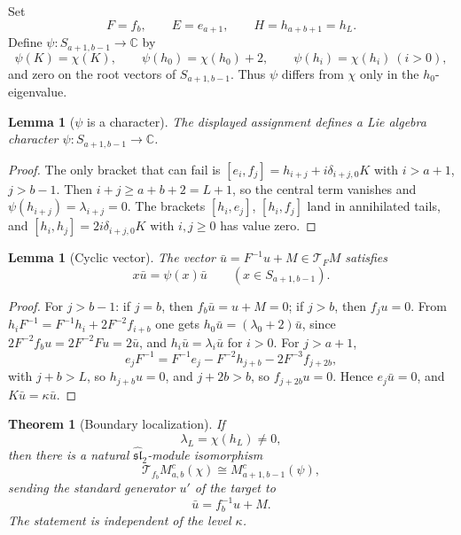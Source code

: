 \documentclass[11pt,a4paper]{article}
\newcommand{\C}{\mathbb C}
\newcommand{\slh}{\widehat{\mathfrak{sl}}_2}
\newcommand{\T}{\mathcal T}
\theoremstyle{plainupright}
\newtheorem{lemma}[proposition]{Lemma}
\newtheorem{theorem}[proposition]{Theorem}
\begin{document}
Set
\[
F=f_b,\qquad E=e_{a+1},\qquad H=h_{a+b+1}=h_L.
\]
Define \(\psi:S_{a+1,b-1}\to\C\) by
\[
\psi(K)=\chi(K),\qquad
\psi(h_0)=\chi(h_0)+2,\qquad
\psi(h_i)=\chi(h_i)\ (i>0),
\]
and zero on the root vectors of \(S_{a+1,b-1}\). Thus \(\psi\) differs from
\(\chi\) only in the \(h_0\)-eigenvalue.

\begin{lemma}[\(\psi\) is a character]\label{lem:char}
The displayed assignment defines a Lie algebra character
\(\psi:S_{a+1,b-1}\to\C\).
\end{lemma}

\begin{proof}
The only bracket that can fail is
\([e_i,f_j]=h_{i+j}+i\delta_{i+j,0}K\) with \(i>a+1\), \(j>b-1\). Then
\(i+j\ge a+b+2=L+1\), so the central term vanishes and
\(\psi(h_{i+j})=\lambda_{i+j}=0\). The brackets \([h_i,e_j]\), \([h_i,f_j]\)
land in annihilated tails, and \([h_i,h_j]=2i\delta_{i+j,0}K\) with
\(i,j\ge0\) has value zero.
\end{proof}

\begin{lemma}[Cyclic vector]\label{lem:cyc}
The vector \(\bar u=F^{-1}u+M\in\T_FM\) satisfies
\[
x\bar u=\psi(x)\bar u\qquad(x\in S_{a+1,b-1}).
\]
\end{lemma}

\begin{proof}
For \(j>b-1\): if \(j=b\), then \(f_b\bar u=u+M=0\); if \(j>b\), then
\(f_ju=0\). From \(h_iF^{-1}=F^{-1}h_i+2F^{-2}f_{i+b}\) one gets
\(h_0\bar u=(\lambda_0+2)\bar u\), since \(2F^{-2}f_bu=2F^{-2}Fu=2\bar u\),
and \(h_i\bar u=\lambda_i\bar u\) for \(i>0\). For \(j>a+1\),
\[
e_jF^{-1}=F^{-1}e_j-F^{-2}h_{j+b}-2F^{-3}f_{j+2b},
\]
with \(j+b>L\), so \(h_{j+b}u=0\), and \(j+2b>b\), so \(f_{j+2b}u=0\). Hence
\(e_j\bar u=0\), and \(K\bar u=\kappa\bar u\).
\end{proof}

\begin{theorem}[Boundary localization]\label{thm:boundary}
If
\[
\lambda_L=\chi(h_L)\ne0,
\]
then there is a natural \(\slh\)-module isomorphism
\[
\boxed{\ \T_{f_b}M^c_{a,b}(\chi)\cong M^c_{a+1,b-1}(\psi),\ }
\]
sending the standard generator \(u'\) of the target to
\[
\bar u=f_b^{-1}u+M.
\]
The statement is independent of the level \(\kappa\).
\end{theorem}
\end{document}
